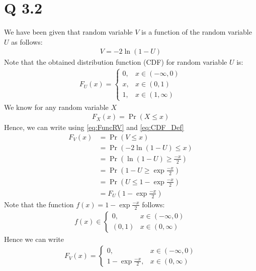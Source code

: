 \documentclass[journal,12pt,twocolumn]{IEEEtran}
\begin{document}
\section{Q 3.2}
We have been given that random variable $V$ is a function of the random variable $U$ as follows:
\begin{align}
    V = -2\ln{(1 - U)}
    \label{eq:FuncRV}
\end{align}
	Note that the obtained distribution function (CDF) for random variable $U$ is:
\begin{align}
    	F_U(x) =
	\begin{cases}
		0, & x \in (-\infty, 0) \\
		x, & x \in (0, 1) \\
		1, & x \in (1, \infty)
	\end{cases}
	\label{eq:CDF_U}
\end{align}
We know for any random variable $X$
\begin{align}
    F_X(x) = \Pr(X \leq x)
	    \label{eq:CDF_Def}
\end{align}
	Hence, we can write using \eqref{eq:FuncRV} and \eqref{eq:CDF_Def}
\begin{align}
	F_V(x) &= \Pr(V \leq x) \\
	&= \Pr(-2\ln{(1 - U)} \leq x)\\
	&= \Pr(\ln{(1 - U)} \geq \frac{-x}{2})\\
	&= \Pr(1 - U \geq \exp{\frac{-x}{2}})\\
	&= \Pr(U \leq 1 - \exp{\frac{-x}{2}})\\
	&= F_U(1 - \exp{\frac{-x}{2}})
	\label{eq: CDF_Rel}
\end{align}
Note that the function $f(x) = 1 - \exp{\frac{-x}{2}}$ follows:
\begin{align}
    f(x) \in
	\begin{cases}
	    {0}, & x \in (-\infty, 0) \\
	    (0, 1) & x \in (0, \infty)
	\end{cases}
\end{align}
Hence we can write
\begin{align}
	F_V(x) =
	\begin{cases}
	    0, & x \in (-\infty, 0) \\
	    1 - \exp{\frac{-x}{2}}, & x \in (0, \infty)
    	\end{cases}
\end{align}
\end{document}
